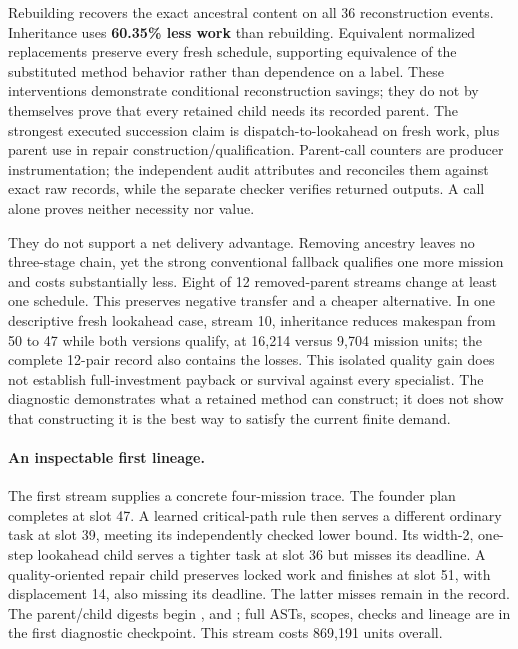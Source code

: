Rebuilding recovers the exact ancestral content on all 36 reconstruction events. Inheritance uses \textbf{60.35\% less work} than rebuilding. Equivalent normalized replacements preserve every fresh schedule, supporting equivalence of the substituted method behavior rather than dependence on a label. These interventions demonstrate conditional reconstruction savings; they do not by themselves prove that every retained child needs its recorded parent. The strongest executed succession claim is dispatch-to-lookahead on fresh work, plus parent use in repair construction/qualification. Parent-call counters are producer instrumentation; the independent audit attributes and reconciles them against exact raw records, while the separate checker verifies returned outputs. A call alone proves neither necessity nor value.

They do not support a net delivery advantage. Removing ancestry leaves no three-stage chain, yet the strong conventional fallback qualifies one more mission and costs substantially less. Eight of 12 removed-parent streams change at least one schedule. This preserves negative transfer and a cheaper alternative. In one descriptive fresh lookahead case, stream 10, inheritance reduces makespan from 50 to 47 while both versions qualify, at 16,214 versus 9,704 mission units; the complete 12-pair record also contains the losses. This isolated quality gain does not establish full-investment payback or survival against every specialist. The diagnostic demonstrates what a retained method can construct; it does not show that constructing it is the best way to satisfy the current finite demand.

\paragraph{An inspectable first lineage.}
The first stream supplies a concrete four-mission trace. The founder plan completes at slot 47. A learned critical-path rule then serves a different ordinary task at slot 39, meeting its independently checked lower bound. Its width-2, one-step lookahead child serves a tighter task at slot 36 but misses its deadline. A quality-oriented repair child preserves locked work and finishes at slot 51, with displacement 14, also missing its deadline. The latter misses remain in the record. The parent/child digests begin ,  and ; full ASTs, scopes, checks and lineage are in the first diagnostic checkpoint. This stream costs 869,191 units overall.
